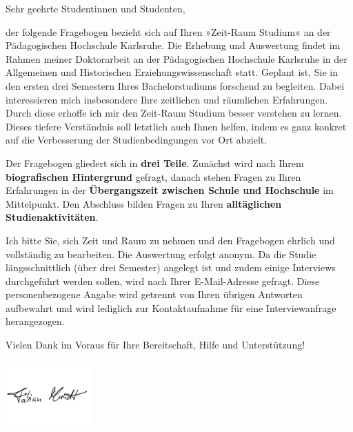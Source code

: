 

\begin{info}
\vspace{.5cm}

Sehr geehrte Studentinnen und Studenten,

\vspace{.5em}

der folgende Fragebogen bezieht sich auf Ihren »Zeit-Raum Studium« an der Pädagogischen Hochschule Karlsruhe. Die Erhebung und Auswertung findet im Rahmen meiner Doktorarbeit an der Pädagogischen Hochschule Karlsruhe in der Allgemeinen und Historischen Erziehungswissenschaft statt. Geplant ist, Sie in den ersten drei Semestern Ihres Bachelorstudiums forschend zu begleiten. Dabei interessieren mich insbesondere Ihre zeitlichen und räumlichen Erfahrungen. Durch diese erhoffe ich mir den Zeit-Raum Studium besser verstehen zu lernen. Dieses tiefere Verständnis soll letztlich auch Ihnen helfen, indem es ganz konkret auf die Verbesserung der Studienbedingungen vor Ort abzielt.

\vspace{.5em}

Der Fragebogen gliedert sich in \textbf{drei Teile}. Zunächst wird nach Ihrem \textbf{biografischen Hintergrund} gefragt, danach stehen Fragen zu Ihren Erfahrungen in der \textbf{Übergangszeit zwischen Schule und Hochschule} im Mittelpunkt. Den Abschluss bilden Fragen zu Ihren \textbf{alltäglichen Studienaktivitäten}.

\vspace{.5em}

Ich bitte Sie, sich Zeit und Raum zu nehmen und den Fragebogen ehrlich und vollständig zu bearbeiten. Die Auswertung erfolgt anonym. Da die Studie längsschnittlich (über drei Semester) angelegt ist und zudem einige Interviews durchgeführt werden sollen, wird nach Ihrer E-Mail-Adresse  gefragt. Diese personenbezogene Angabe wird getrennt von Ihren übrigen Antworten aufbewahrt und wird lediglich zur Kontaktaufnahme für eine Interviewanfrage herangezogen.

\vspace{.5em}

Vielen Dank im Voraus für Ihre Bereitschaft, Hilfe und Unterstützung!

\vspace{-1cm}

\includegraphics[width=0.25\textwidth]{unterschrift.png}

\vspace{-1.5cm}
\end{info}

